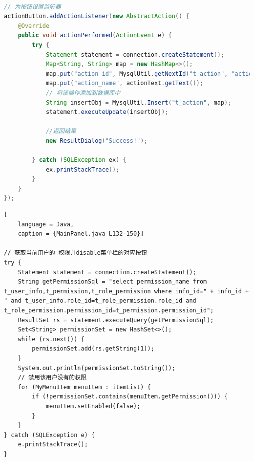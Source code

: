 \documentclass[12pt, a4paper, oneside]{ctexart}
\begin{document}
\begin{lstlisting}[language = Java,
    caption = {AddPermissionPanel.java L50-69}]

// 为按钮设置监听器
actionButton.addActionListener(new AbstractAction() {
    @Override
    public void actionPerformed(ActionEvent e) {
        try {
            Statement statement = connection.createStatement();
            Map<String, String> map = new HashMap<>();
            map.put("action_id", MysqlUtil.getNextId("t_action", "action_id"));
            map.put("action_name", actionText.getText());
            // 将该操作添加到数据库中
            String insertObj = MysqlUtil.Insert("t_action", map);
            statement.executeUpdate(insertObj);

            //返回结果
            new ResultDialog("Success!");

        } catch (SQLException ex) {
            ex.printStackTrace();
        }
    }
});

\end{lstlisting}


\begin{lstlisting}[
    language = Java,
    caption = {MainPanel.java L132-150}]

// 获取当前用户的 权限并disable菜单栏的对应按钮
try {
    Statement statement = connection.createStatement();
    String getPermissionSql = "select permission_name from t_user_info,t_permission,t_role_permission where info_id=" + info_id + " and t_user_info.role_id=t_role_permission.role_id and t_role_permission.permission_id=t_permission.permission_id";
    ResultSet rs = statement.executeQuery(getPermissionSql);
    Set<String> permissionSet = new HashSet<>();
    while (rs.next()) {
        permissionSet.add(rs.getString(1));
    }
    System.out.println(permissionSet.toString());
    // 禁用该用户没有的权限
    for (MyMenuItem menuItem : itemList) {
        if (!permissionSet.contains(menuItem.getPermission())) {
            menuItem.setEnabled(false);
        }
    }
} catch (SQLException e) {
    e.printStackTrace();
}

\end{lstlisting}
\end{document}
